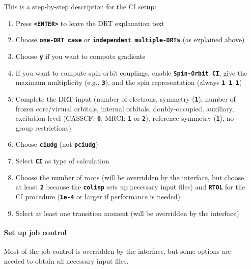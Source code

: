 \documentclass[a4paper,11pt,DIV=15,openany]{scrbook}
\newcommand{\ttt}[1]{\textbf{\texttt{#1}}}
\begin{document}
This is a step-by-step description for the CI setup:
\begin{enumerate}
  \item Press \ttt{<ENTER>} to leave the DRT explanation text
  \item Choose \ttt{one-DRT case} or \ttt{independent multiple-DRTs} (as explained above)
  \item Choose \ttt{y} if you want to compute gradients
  \item If you want to compute spin-orbit couplings, enable \ttt{Spin-Orbit CI}, give the maximum multiplicity (e.g., \ttt{3}), and the spin representation (always \ttt{1 1 1})
  \item Complete the DRT input (number of electrons, symmetry (\ttt{1}), number of frozen core/virtual orbitals, internal orbitals, doubly-occupied, auxiliary, excitation level (CASSCF: \ttt{0}, MRCI: \ttt{1} or \ttt{2}), reference symmetry (\ttt{1}), no group restrictions)
  \item Choose \ttt{ciudg} (not \ttt{pciudg})
  \item Select \ttt{CI} as type of calculation
  \item Choose the number of roots (will be overridden by the interface, but choose at least \ttt{2} because the \ttt{colinp} sets up necessary input files) and \ttt{RTOL} for the CI procedure (\ttt{1e-4} or larger if performance is needed)
  \item Select at least one transition moment (will be overridden by the interface)
\end{enumerate}

\paragraph{Set up job control}

Most of the job control is overridden by the interface, but some options are needed to obtain all necessary input files.
\end{document}

